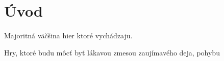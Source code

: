 \section{Úvod}
\paragraph{}

Majoritná väčšina hier ktoré vychádzaju.

Hry, ktoré budu môcť byť lákavou zmesou zaujímavého deja, pohybu
